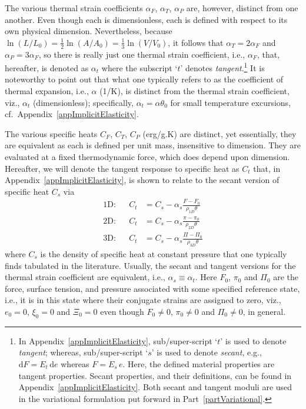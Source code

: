 The various thermal strain coefficients $\alpha_F$, $\alpha_T$, $\alpha_P$ are, however, distinct from one another.  Even though each is dimensionless, each is defined with respect to its own physical dimension.  Nevertheless, because $\ln(L / L_0) = \tfrac{1}{2} \ln (A / \! A_0) = \tfrac{1}{3} \ln (V \! / V_0)$, it follows that $\alpha_T = 2 \alpha_F$ and $\alpha_P = 3 \alpha_F$, so there is really just one thermal strain coefficient, i.e., $\alpha_F$, that, hereafter, is denoted as $\alpha_t$ where the subscript `$t$' denotes \textit{tangent}.\footnote{
    In Appendix~\ref{appImplicitElasticity}, sub\slash super-script `$t$' is used to denote \textit{tangent\/}; whereas, sub\slash super-script `$s$' is used to denote \textit{secant}, e.g., $\mathrm{d}F = E_t \, \mathrm{d} e$ whereas $F = E_s \, e$.  Here, the defined material properties are tangent properties.  Secant properties, and their definitions, can be found in Appendix~\ref{appImplicitElasticity}.  Both secant and tangent moduli are used in the variational formulation put forward in Part~\ref{partVariational}.
}
It is noteworthy to point out that what one typically refers to as the coefficient of thermal expansion, i.e., $\alpha$ (1/K), is distinct from the thermal strain coefficient, viz., $\alpha_t$ (dimensionless); specifically, $\alpha_t = \alpha \theta_0$ for small temperature excursions, cf.\ Appendix~\ref{appImplicitElasticity}.

The various specific heats $C_F$, $C_T$, $C_P$ (erg/g.K) are distinct, yet essentially, they are equivalent as each is defined per unit mass, insensitive to dimension.  They are evaluated at a fixed thermo\-dynamic force, which does depend upon dimension.  Hereafter, we will denote the tangent response to specific heat as $C_t$ that, in Appendix~\ref{appImplicitElasticity}, is shown to relate to the secant version of specific heat $C_s$ via
\begin{subequations}
    \label{specificHeats}
    \begin{align}
    \text{1D:} & &
    C_t & = C_s - \alpha_s \frac{F - F_0}{\rho_{1D} \theta} \\ 
    \text{2D:} & &
    C_t & = C_s - \alpha_s \frac{\pi - \pi_0}{\rho_{2D} \theta} \\
    \text{3D:} & &
    C_t & = C_s - \alpha_s \frac{\Pi - \Pi_0}{\rho_{3D} \theta}
    \end{align}
\end{subequations}
where $C_s$ is the density of specific heat at constant pressure that one typically finds tabulated in the literature. Usually, the secant and tangent versions for the thermal strain coefficient are equivalent, i.e., $\alpha_s \equiv \alpha_t$.  Here $F_0$, $\pi_0$ and $\Pi_0$ are the force, surface tension, and pressure associated with some specified reference state, i.e., it is in this state where their conjugate strains are assigned to zero, viz., $e_0 = 0$, $\xi_0 = 0$ and $\Xi_0 = 0$ even though $F_0 \neq 0$, $\pi_0 \neq 0$ and $\Pi_0 \neq 0$, in general.

